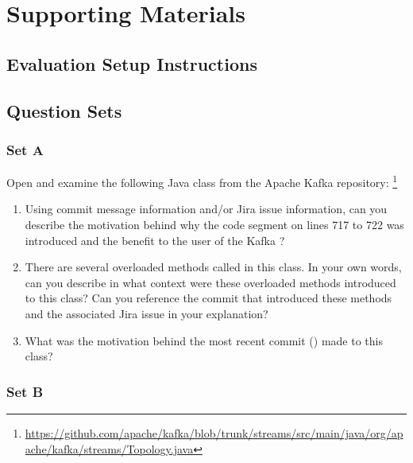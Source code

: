 \chapter{Supporting Materials}

\section{Evaluation Setup Instructions}
\label{sec:Setup-Instructions}


\section{Question Sets}

\subsection{Set A}
\label{subsec:Question-Set-A}

Open and examine the following Java class from the Apache Kafka repository:
\footnote{\url{https://github.com/apache/kafka/blob/trunk/streams/src/main/java/org/apache/kafka/streams/Topology.java}}

\begin{enumerate}
    \item Using commit message information and/or Jira issue information, can you describe the motivation behind why the code segment on lines 717 to 722 was introduced and the benefit to the user of the Kafka ?
    \item There are several overloaded methods called  in this class. In your own words, can you describe in what context were these overloaded methods introduced to this class? Can you reference the commit that introduced these methods and the associated Jira issue in your explanation?
    \item What was the motivation behind the most recent commit () made to this class?
\end{enumerate}

\subsection{Set B}
\label{subsec:Question-Set-B}

